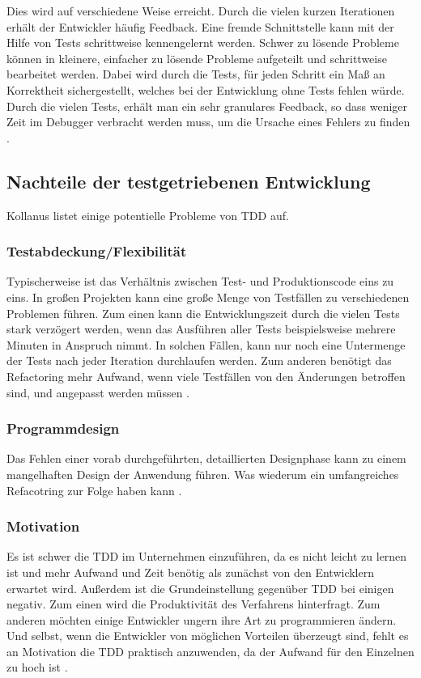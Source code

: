 Dies wird auf verschiedene Weise erreicht. Durch die vielen kurzen Iterationen erhält der Entwickler häufig Feedback. Eine fremde Schnittstelle kann mit der Hilfe von Tests schrittweise kennengelernt werden. Schwer zu lösende Probleme können in kleinere, einfacher zu lösende Probleme aufgeteilt und schrittweise bearbeitet werden. Dabei wird durch die Tests, für jeden Schritt ein Maß an Korrektheit sichergestellt, welches bei der Entwicklung ohne Tests fehlen würde. Durch die vielen Tests, erhält man ein sehr granulares Feedback, so dass weniger Zeit im Debugger verbracht werden muss, um die Ursache eines Fehlers zu finden  \cite{Beck2003TestExample, Link2005SoftwaretestsEntwicklung, Martin2007ProfessionalismDevelopment}.

\subsection{Nachteile der testgetriebenen Entwicklung} \label{sec:tddNachteile}
Kollanus \cite{Kollanus2011CriticalDevelopment} listet einige potentielle Probleme von TDD auf.

\subsubsection{Testabdeckung/Flexibilität} Typischerweise ist das Verhältnis zwischen Test- und Produktionscode eins zu eins. In großen Projekten kann eine große Menge von Testfällen zu verschiedenen Problemen führen. Zum einen kann die Entwicklungszeit durch die vielen Tests stark verzögert werden, wenn das Ausführen aller Tests beispielsweise mehrere Minuten in Anspruch nimmt. In solchen Fällen, kann nur noch eine Untermenge der Tests nach jeder Iteration durchlaufen werden. Zum anderen benötigt das Refactoring mehr Aufwand, wenn viele Testfällen von den Änderungen betroffen sind, und angepasst werden müssen \cite{Kollanus2011CriticalDevelopment}.

\subsubsection{Programmdesign} Das Fehlen einer vorab durchgeführten, detaillierten Designphase kann zu einem mangelhaften Design der Anwendung führen. Was wiederum ein umfangreiches Refacotring zur Folge haben kann \cite{Kollanus2011CriticalDevelopment}.

\subsubsection{Motivation} Es ist schwer die TDD im Unternehmen einzuführen, da es nicht leicht zu lernen ist und mehr Aufwand und Zeit benötig als zunächst von den Entwicklern erwartet wird. Außerdem ist die Grundeinstellung gegenüber TDD bei einigen negativ. Zum einen wird die Produktivität des Verfahrens hinterfragt. Zum anderen möchten einige Entwickler ungern ihre Art zu programmieren ändern. Und selbst, wenn die Entwickler von möglichen Vorteilen überzeugt sind, fehlt es an Motivation die TDD praktisch anzuwenden, da der Aufwand für den Einzelnen zu hoch ist \cite{Kollanus2011CriticalDevelopment}.

